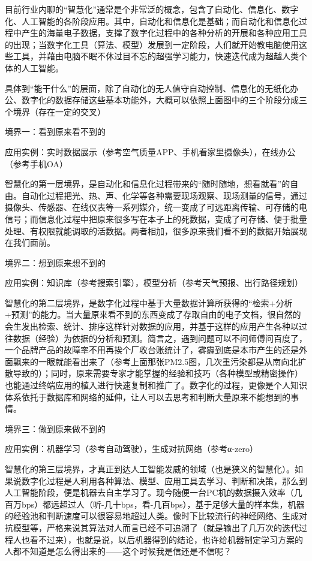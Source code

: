 \documentclass[]{book}
\begin{document}
目前行业内聊的``智慧化''通常是个非常泛的概念，包含了自动化、信息化、数字化、人工智能的各阶段应用。其中，自动化和信息化是基础；而自动化和信息化过程中产生的海量电子数据，支撑了数字化过程中的各种分析的开展和各种应用工具的出现；当数字化工具（算法、模型）发展到一定阶段，人们就开始教电脑使用这些工具，并藉由电脑不眠不休过目不忘的超强学习能力，快速迭代成为超越人类个体的人工智能。

具体到``能干什么''的层面，除了自动化的无人值守自动控制、信息化的无纸化办公、数字化的数据存储这些基本功能外，大概可以依照上面图中的三个阶段分成三个境界（存在一定的交叉）

境界一：看到原来看不到的

应用实例：实时数据展示（参考空气质量APP、手机看家里摄像头），在线办公（参考手机OA）

智慧化的第一层境界，是自动化和信息化过程带来的``随时随地，想看就看''的自由。自动化过程把光、热、声、化学等各种需要现场观察、现场测量的信号，通过摄像头、传感器、在线仪表等一系列媒介，统一变成了可远距离传输、可存储的电信号；而信息化过程中把原来很多写在本子上的死数据，变成了可存储、便于批量处理、有权限就能调取的活数据。两者相加，很多原来我们看不到的数据开始展现在我们面前。

境界二：想到原来想不到的

应用实例：知识库（参考搜索引擎），模型分析（参考天气预报、出行路径规划）

智慧化的第二层境界，是数字化过程中基于大量数据计算所获得的``检索+分析+预测''的能力。当大量原来看不到的东西变成了存取自由的电子文档，很自然的会生发出检索、统计、排序这样针对数据的应用，并基于这样的应用产生各种以过往数据（经验）为依据的分析和预测。简言之，遇到问题可以不问师傅问百度了，一个品牌产品的故障率不用再挨个厂收台账统计了，雾霾到底是本市产生的还是外面飘来的一眼就能看出来了（参考上面那张PM2.5图，几次重污染都是从南向北扩散导致的）；同时，原来需要专家才能掌握的经验和技巧（各种模型或精密操作）也能通过终端应用的植入进行快速复制和推广了。数字化的过程，更像是个人知识体系依托于数据库和网络的延伸，让人可以去思考和判断大量原来不能想到的事情。

境界三：做到原来做不到的

应用实例：机器学习（参考自动驾驶），生成对抗网络（参考α-zero）

智慧化的第三层境界，才真正到达人工智能发威的领域（也是狭义的智慧化）。如果说数字化过程是人利用各种算法、模型、应用工具去学习、判断和决策，那么到人工智能阶段，便是机器去自主学习了。现今随便一台PC机的数据摄入效率（几百万bps）都远超过人（听-几十bps，看-几百bps），基于足够大量的样本集，机器的经验池和判断速度可以很容易地超过人类。像时下比较流行的神经网络、生成对抗模型等，严格来说其算法对人而言已经不可追溯了（就是输出了几万次的迭代过程人也看不过来），也就是说，以后机器得到的结论，也许给机器制定学习方案的人都不知道是怎么得出来的------这个时候我是信还是不信呢？
\end{document}
